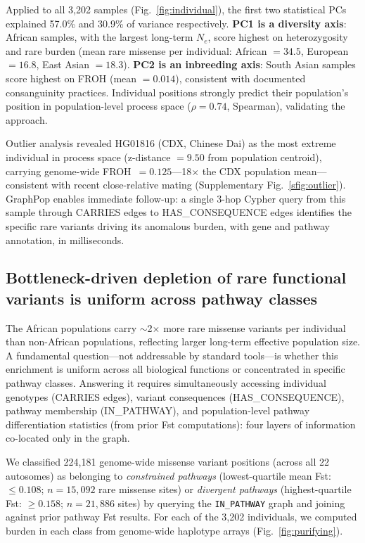 Applied to all 3{,}202 samples (Fig.~\ref{fig:individual}), the first two statistical PCs explained 57.0\% and 30.9\% of variance respectively. \textbf{PC1 is a diversity axis}: African samples, with the largest long-term $N_e$, score highest on heterozygosity and rare burden (mean rare missense per individual: African $= 34.5$, European $= 16.8$, East Asian $= 18.3$). \textbf{PC2 is an inbreeding axis}: South Asian samples score highest on FROH (mean $= 0.014$), consistent with documented consanguinity practices. Individual positions strongly predict their population's position in population-level process space ($\rho = 0.74$, Spearman), validating the approach.

Outlier analysis revealed HG01816 (CDX, Chinese Dai) as the most extreme individual in process space (z-distance $= 9.50$ from population centroid), carrying genome-wide FROH~$= 0.125$---18$\times$ the CDX population mean---consistent with recent close-relative mating (Supplementary Fig.~\ref{sfig:outlier}). GraphPop enables immediate follow-up: a single 3-hop Cypher query from this sample through CARRIES edges to HAS\_CONSEQUENCE edges identifies the specific rare variants driving its anomalous burden, with gene and pathway annotation, in milliseconds.

\subsection*{Bottleneck-driven depletion of rare functional variants is uniform across pathway classes}

The African populations carry $\sim$2$\times$ more rare missense variants per individual than non-African populations, reflecting larger long-term effective population size. A fundamental question---not addressable by standard tools---is whether this enrichment is uniform across all biological functions or concentrated in specific pathway classes. Answering it requires simultaneously accessing individual genotypes (CARRIES edges), variant consequences (HAS\_CONSEQUENCE), pathway membership (IN\_PATHWAY), and population-level pathway differentiation statistics (from prior Fst computations): four layers of information co-located only in the graph.

We classified 224{,}181 genome-wide missense variant positions (across all 22 autosomes) as belonging to \emph{constrained pathways} (lowest-quartile mean Fst: $\leq 0.108$; $n = 15{,}092$ rare missense sites) or \emph{divergent pathways} (highest-quartile Fst: $\geq 0.158$; $n = 21{,}886$ sites) by querying the \texttt{IN\_PATHWAY} graph and joining against prior pathway Fst results. For each of the 3{,}202 individuals, we computed burden in each class from genome-wide haplotype arrays (Fig.~\ref{fig:purifying}).

